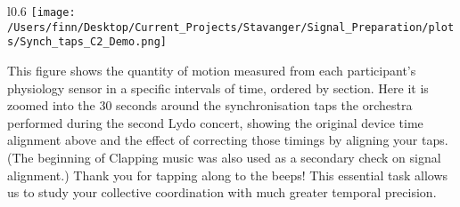 
\begin{center}
\begin{minipage}[h]{0.90\linewidth}
	\begin{wrapfigure}{l}{0.6\textwidth}
		\texttt{[image: /Users/finn/Desktop/Current\_Projects/Stavanger/Signal\_Preparation/plots/Synch\_taps\_C2\_Demo.png]}
		\\	%
	\end{wrapfigure}
	
	This figure shows the quantity of motion measured from each participant's physiology sensor in a specific intervals of time, ordered by section. Here it is zoomed into the 30 seconds around the synchronisation taps the orchestra performed during the second Lydo concert, showing the original device time alignment above and the effect of correcting those timings by aligning your taps. (The beginning of Clapping music was also used as a secondary check on signal alignment.) Thank you for tapping along to the beeps! This essential task allows us to study your collective coordination with much greater temporal precision.
\end{minipage}
\end{center}
\vspace{0.5cm}
	\SepRule
\vspace{0.5cm}
